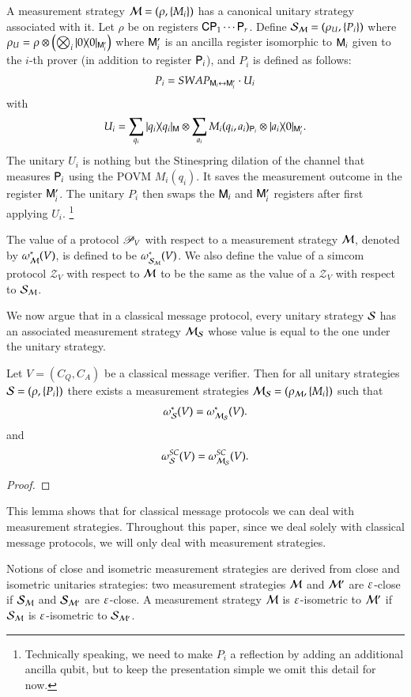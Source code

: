 A measurement strategy $\mathcal M = (\rho,\{M_i\})$ has a canonical unitary strategy associated with it.
Let $\rho$ be on registers ${\mathsf{C}} {\mathsf{P}}_1 \cdots {\mathsf{P}}_r$. Define $\mathcal{S}_\mathcal M = (\rho_U,\{P_i\})$ where $\rho_U = \rho \otimes \left( \bigotimes_i |0\rangle\! \langle 0|_{{\mathsf{M}}_i'}\right)$ where ${\mathsf{M}}_i'$ is an ancilla register isomorphic to ${\mathsf{M}}_i$ given to the $i$-th prover (in addition to register ${\mathsf{P}}_i$), and $P_i$ is defined as follows:
\[
	P_i = SWAP_{{\mathsf{M}}_i \leftrightarrow {\mathsf{M}}_i'} \cdot U_i
\]
with
\[
	U_i = \sum_{q_i} |q_i\rangle\! \langle q_i|_{{\mathsf{M}}} \otimes \sum_{a_i} M_i(q_i,a_i)_{{\mathsf{P}}_i} \otimes |a_i\rangle\! \langle 0|_{{\mathsf{M}}_i'}.
\]
The unitary $U_i$ is nothing but the Stinespring dilation of the channel that measures ${\mathsf{P}}_i$ using the POVM $M_i(q_i)$. It saves the measurement outcome in the register ${\mathsf{M}}_i'$. The unitary $P_i$ then swaps the ${\mathsf{M}}_i$ and ${\mathsf{M}}_i'$ registers after first applying $U_i$. \footnote{Technically speaking, we need to make $P_i$ a reflection by adding an additional ancilla qubit, but to keep the presentation simple we omit this detail for now.} 

The value of a protocol $\mathscr{P}_V$ with respect to a measurement strategy $\mathcal M$, denoted by $\omega^*_{\mathcal M}(V)$, is defined to be $\omega^*_{\mathcal{S}_\mathcal M}(V)$. We also define the value of a simcom protocol $\mathscr{Z}_V$ with respect to $\mathcal M$ to be the same as the value of a $\mathscr{Z}_V$ with respect to $\mathcal{S}_\mathcal M$. 

We now argue that in a classical message protocol, every unitary strategy $\mathcal{S}$ has an associated measurement strategy $\mathcal M_{\mathcal{S}}$ whose value is equal to the one under the unitary strategy.

\begin{lemma}
\label{lem:unitary_measurement_strat}
Let $V = (C_Q,C_A)$ be a classical message verifier. Then for all unitary strategies $\mathcal{S} = (\rho,\{ P_i \})$ there exists a measurement strategies $\mathcal M_{\mathcal{S}} = (\rho_\mathcal M,\{M_i\})$ such that
	\[
		\omega^*_{\mathcal{S}}(V) = \omega^*_{\mathcal M_{\mathcal{S}}}(V).
	\]
	and
	\[
		\omega^{SC}_{\mathcal{S}}(V) = \omega^{SC}_{\mathcal M_{\mathcal{S}}}(V).
	\]	
\end{lemma}
\begin{proof}
\end{proof}

This lemma shows that for classical message protocols we can deal with measurement strategies. Throughout this paper, since we deal solely with classical message protocols, we will only deal with measurement strategies.

Notions of close and isometric measurement strategies are derived from close and isometric unitaries strategies: two measurement strategies $\mathcal M$ and $\mathcal M'$ are $\varepsilon$-close if $\mathcal{S}_{\mathcal M}$ and $\mathcal{S}_{\mathcal M'}$ are $\varepsilon$-close. A measurement strategy $\mathcal M$ is $\varepsilon$-isometric to $\mathcal M'$ if $\mathcal{S}_{\mathcal M}$ is $\varepsilon$-isometric to $\mathcal{S}_{\mathcal M'}$.  

